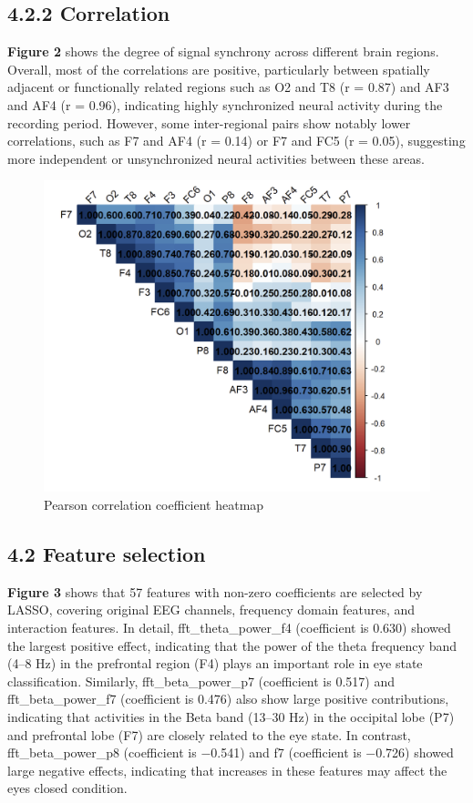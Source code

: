 \documentclass[
  doc]{apa6}
\begin{document}
\subsection{4.2.2 Correlation}\label{correlation}

\textbf{Figure 2} shows the degree of signal synchrony across different brain regions. Overall, most of the correlations are positive, particularly between spatially adjacent or functionally related regions such as O2 and T8 (r = 0.87) and AF3 and AF4 (r = 0.96), indicating highly synchronized neural activity during the recording period. However, some inter-regional pairs show notably lower correlations, such as F7 and AF4 (r = 0.14) or F7 and FC5 (r = 0.05), suggesting more independent or unsynchronized neural activities between these areas.

\begin{figure}[H]

{\centering \includegraphics[width=0.8\linewidth]{figure/2} 

}

\caption{Pearson correlation coefficient heatmap}\label{fig:unnamed-chunk-2}
\end{figure}

\newpage

\subsection{4.2 Feature selection}\label{feature-selection}

\textbf{Figure 3} shows that 57 features with non-zero coefficients are selected by LASSO, covering original EEG channels, frequency domain features, and interaction features. In detail, fft\_theta\_power\_f4 (coefficient is 0.630) showed the largest positive effect, indicating that the power of the theta frequency band (4--8 Hz) in the prefrontal region (F4) plays an important role in eye state classification. Similarly, fft\_beta\_power\_p7 (coefficient is 0.517) and fft\_beta\_power\_f7 (coefficient is 0.476) also show large positive contributions, indicating that activities in the Beta band (13--30 Hz) in the occipital lobe (P7) and prefrontal lobe (F7) are closely related to the eye state. In contrast, fft\_beta\_power\_p8 (coefficient is −0.541) and f7 (coefficient is −0.726) showed large negative effects, indicating that increases in these features may affect the eyes closed condition.
\end{document}
